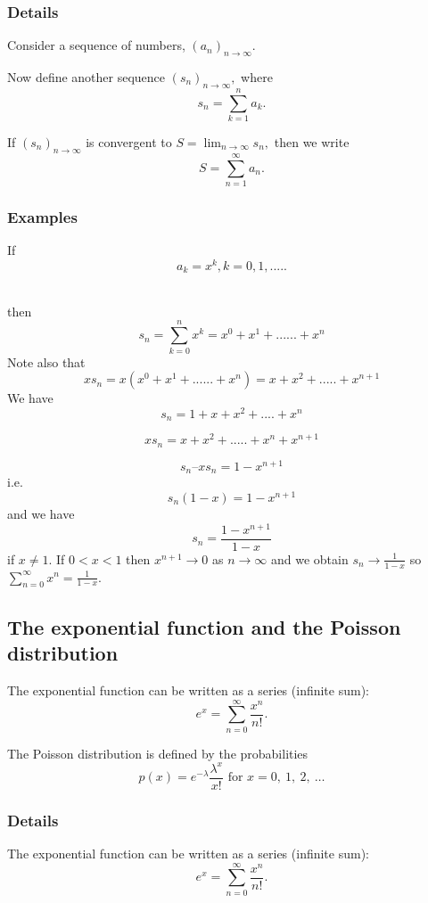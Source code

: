 \documentclass[12pt,a4paper]{article}
\theoremstyle{regla}
\theoremstyle{remark}
\theoremstyle{definition}
\theoremstyle{nonumberbreak}
\begin{document}
\subsubsection{Details}
Consider a sequence of numbers, $(a_n)_{n\to\infty}$. 

Now define another sequence $(s_n)_{n\to\infty},$ where 
$$s_n=\sum_{k=1}^na_k.$$

 
If $(s_n)_{n\to\infty}$ is convergent to $S=\lim_{n\to\infty}s_n,$ then we write 
$$S=\sum_{n=1}^{\infty}a_n.$$

 



\subsubsection{Examples}
\begin{xmpl}
If $$a_k = x^k, k=0,1,.....$$

\\ then 
$$s_n=\sum_{k=0}^{n}x^k=x^0+x^1+......+x^n$$
Note also that
$$xs_n=x(x^0+x^1+......+x^n)= x + x^2 + ..... + x^{n+1}$$
We have
$$s_n = 1 + x + x^2 + .... + x^n$$

$$xs_n = x + x^2 + ..... +x^n + x^{n+1}$$

$$s_n – xs_n = 1 - x^{n+1}$$
i.e.
$$s_n(1-x) = 1-x^{n+1}$$
and we have
	$$s_n =\frac{1-x^{n+1}}{1-x}$$
if $x\neq1$. 
If $0< x<1$ then $x^{n+1}\to 0$ as $n\to\infty$ and we obtain $s_n\to\frac{1}{1-x}$ so $\sum_{n=0}^{\infty}x^n=\frac{1}{1-x}$.
\end{xmpl}

\subsection{The exponential function and the Poisson distribution}
\begin{fbox}
\begin{minipage}{0.97\textwidth}
The exponential function can be written as a series (infinite sum):
$$e^x=\sum_{n=0}^{\infty}\frac{x^n}{n!}.$$

 

The Poisson distribution is defined by the probabilities 
$$p(x)=e^{-\lambda}\frac{\lambda^x}{x!}\textrm{ for } x=0,\ 1,\ 2,\ \ldots$$

 

\end{minipage}
\end{fbox}
\subsubsection{Details}
The exponential function can be written as a series (infinite sum):
$$e^x=\sum_{n=0}^{\infty}\frac{x^n}{n!}.$$
\end{document}
